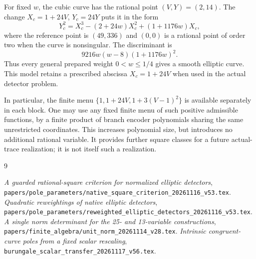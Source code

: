 \documentclass[11pt,a4paper]{article}
\begin{document}
For fixed \(w\), the cubic curve has the rational point
\((V,Y)=(2,14)\). The change \(X_c=1+24V\), \(Y_c=24Y\)
puts it in the form
\[
 Y_c^2=X_c^3-(2+24w)X_c^2+(1+1176w)X_c,
\]
where the reference point is \((49,336)\) and \((0,0)\) is a
rational point of order two when the curve is nonsingular.
The discriminant is
\[
                    9216w(w-8)(1+1176w)^2.
\]
Thus every general prepared weight \(0<w\le1/4\) gives a smooth
elliptic curve. This model retains a prescribed abscissa
\(X_c=1+24V\) when used in the actual detector problem.

In particular, the finite menu
\(\{1,1+24V,1+3(V-1)^2\}\) is available separately in each block.
One may use any fixed finite menu of such positive admissible
functions, by a finite product of branch encoder polynomials sharing
the same unrestricted coordinates. This increases polynomial size,
but introduces no additional rational variable. It provides further
square classes for a future actual-trace realization; it is not itself
such a realization.

\begin{thebibliography}{9}\raggedright
{}\emph{A guarded rational-square criterion for normalized
elliptic detectors},
\nolinkurl{papers/pole_parameters/native_square_criterion_20261116_v53.tex}.
\emph{Quadratic reweightings of native elliptic
detectors},
\nolinkurl{papers/pole_parameters/reweighted_elliptic_detectors_20261116_v53.tex}.
\emph{A single norm determinant for the 25- and 13-variable
constructions},
\nolinkurl{papers/finite_algebra/unit_norm_20261114_v28.tex}.
\emph{Intrinsic congruent-curve poles from a fixed scalar
rescaling},
\nolinkurl{burungale_scalar_transfer_20261117_v56.tex}.
\end{thebibliography}
\end{document}

